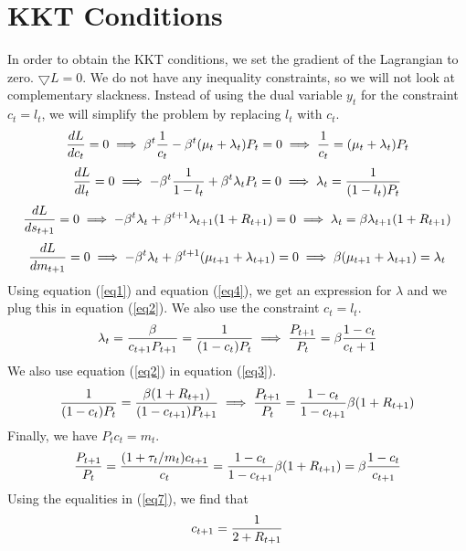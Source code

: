 \section*{KKT Conditions}\label{ch:ch4label}
In order to obtain the KKT conditions, we set the gradient of the Lagrangian to zero. $\bigtriangledown L = 0$. We do not have any inequality constraints, so we will not look at complementary slackness. Instead of using the dual variable $y_t$ for the constraint $c_t=l_t$, we will simplify the problem by replacing $l_t$ with $c_t$.
\begin{align}{\label{eq1}}
	\frac{dL}{dc_t} = 0 \implies \beta^t\frac{1}{c_t}-\beta^t(\mu_t+\lambda_t)P_t=0 \implies \frac{1}{c_t}=(\mu_t+\lambda_t)P_t
\end{align}
\begin{align}{\label{eq2}}
	\frac{dL}{dl_t} = 0 \implies -\beta^t\frac{1}{1-l_t}+\beta^t\lambda_t P_t=0 \implies \lambda_t = \frac{1}{(1-l_t)P_t}
\end{align}
\begin{align}{\label{eq3}}
	\frac{dL}{ds_{t+1}} = 0 \implies -\beta^t\lambda_t+\beta^{t+1}\lambda_{t+1}(1+R_{t+1})=0 \implies \lambda_t = \beta \lambda_{t+1}(1+R_{t+1})
\end{align}
\begin{align}{\label{eq4}}
	\frac{dL}{dm_{t+1}} = 0 \implies -\beta^t\lambda_t+\beta^{t+1}(\mu_{t+1}+\lambda_{t+1})=0 \implies \beta(\mu_{t+1}+\lambda_{t+1})=\lambda_t
\end{align}
Using equation (\ref{eq1}) and equation (\ref{eq4}), we get an expression for $\lambda$ and we plug this in equation (\ref{eq2}). We also use the constraint $c_t=l_t$.
\begin{align}{\label{eq5}}
	\lambda_t=\frac{\beta}{c_{t+1}P_{t+1}} = \frac{1}{(1-c_t)P_t} \implies \frac{P_{t+1}}{P_t} = \beta\frac{1-c_t}{c_t+1}
\end{align}
We also use equation (\ref{eq2}) in equation (\ref{eq3}).
\begin{align}{\label{eq6}}
	\frac{1}{(1-c_t)P_t}=\frac{\beta(1+R_{t+1})}{(1-c_{t+1})P_{t+1}} \implies \frac{P_{t+1}}{P_t}=\frac{1-c_t}{1-c_{t+1}}\beta(1+R_{t+1})
\end{align}
Finally, we have $P_t c_t = m_t$.
\begin{align}{\label{eq7}}
	\frac{P_{t+1}}{P_t}=\frac{(1+\tau_t/m_t)c_{t+1}}{c_t}=\frac{1-c_t}{1-c_{t+1}}\beta(1+R_{t+1})=\beta\frac{1-c_t}{c_{t+1}}
\end{align}
Using the equalities in (\ref{eq7}), we find that
\begin{align}{\label{eq8}}
	c_{t+1} = \frac{1}{2+R_{t+1}}
\end{align}
